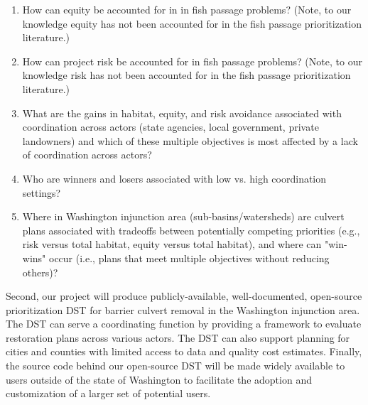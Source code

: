 \documentclass[12pt]{elsarticle}
\begin{document}
\begin{enumerate}
\item How can equity be accounted for in in fish passage problems? (Note, to our knowledge equity has not been accounted for in the fish passage prioritization literature.)
\item How can project risk be accounted for in fish passage problems? (Note, to our knowledge risk has not been accounted for in the fish passage prioritization literature.)
\item What are the gains in habitat, equity, and risk avoidance associated with coordination across actors (state agencies, local government, private landowners) and which of these multiple objectives is most affected by a lack of coordination across actors?
\item Who are winners and losers associated with low vs. high coordination settings?
\item Where in Washington injunction area (sub-basins/watersheds) are culvert plans associated with tradeoffs between potentially competing priorities (e.g., risk versus total habitat, equity versus total habitat), and where can "win-wins" occur (i.e., plans that meet multiple objectives without reducing others)?
\end{enumerate}


Second, our project will produce publicly-available, well-documented, open-source prioritization DST for barrier culvert removal in the Washington injunction area. The DST can serve a coordinating function by providing a framework to evaluate restoration plans across various actors. The DST can also support planning for cities and counties with limited access to data and quality cost estimates. Finally, the source code behind our open-source DST will be made widely available to users outside of the state of Washington to facilitate the adoption and customization of a larger set of potential users. 
\end{document}
